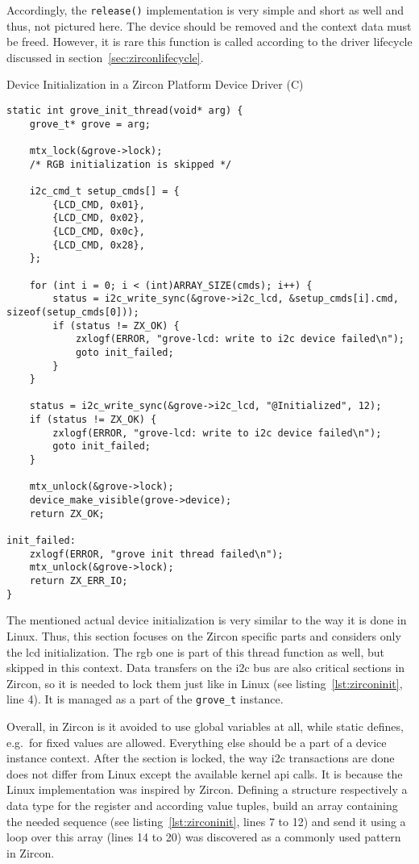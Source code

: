 Accordingly, the \texttt{release()} implementation is very simple and short as well and thus, not pictured here.
The device should be removed and the context data must be freed.
However, it is rare this function is called according to the driver lifecycle discussed in section~\ref{sec:zirconlifecycle}.
%
\begin{listing} [H]
    \caption{Device Initialization in a Zircon Platform Device Driver (C)}
\label{lst:zirconinit}
\begin{verbatim}
static int grove_init_thread(void* arg) {
    grove_t* grove = arg;

    mtx_lock(&grove->lock);
    /* RGB initialization is skipped */

    i2c_cmd_t setup_cmds[] = {
        {LCD_CMD, 0x01},
        {LCD_CMD, 0x02},
        {LCD_CMD, 0x0c},
        {LCD_CMD, 0x28},
    };

    for (int i = 0; i < (int)ARRAY_SIZE(cmds); i++) {
        status = i2c_write_sync(&grove->i2c_lcd, &setup_cmds[i].cmd, sizeof(setup_cmds[0]));
        if (status != ZX_OK) {
            zxlogf(ERROR, "grove-lcd: write to i2c device failed\n");
            goto init_failed;
        }
    }

    status = i2c_write_sync(&grove->i2c_lcd, "@Initialized", 12);
    if (status != ZX_OK) {
        zxlogf(ERROR, "grove-lcd: write to i2c device failed\n");
        goto init_failed;
    }

    mtx_unlock(&grove->lock);
    device_make_visible(grove->device);
    return ZX_OK;

init_failed:
    zxlogf(ERROR, "grove init thread failed\n");
    mtx_unlock(&grove->lock);
    return ZX_ERR_IO;
}
\end{verbatim}
\end{listing}
%
The mentioned actual device initialization is very similar to the way it is done in Linux.
Thus, this section focuses on the Zircon specific parts and considers only the \ac{lcd} initialization.
The \ac{rgb} one is part of this thread function as well, but skipped in this context.
Data transfers on the \ac{i2c} bus are also critical sections in Zircon, so it is needed to lock them just like in Linux (see listing~\ref{lst:zirconinit}, line 4).
It is managed as a part of the \texttt{grove_t} instance.

Overall, in Zircon is it avoided to use global variables at all, while static defines, e.g.\ for fixed values are allowed.
Everything else should be a part of a device instance context.
After the section is locked, the way \ac{i2c} transactions are done does not differ from Linux except the available kernel \ac{api} calls.
It is because the Linux implementation was inspired by Zircon.
Defining a structure respectively a data type for the register and according value tuples, build an array containing the needed sequence (see listing~\ref{lst:zirconinit}, lines 7 to 12) and send it using a loop over this array (lines 14 to 20) was discovered as a commonly used pattern in Zircon.


